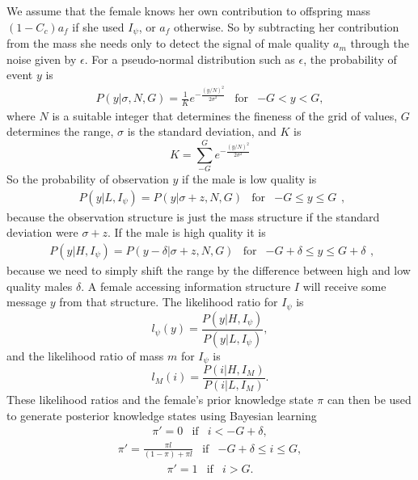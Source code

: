 \documentclass[10pt]{article}
\begin{document}
We assume that the female knows her own contribution to offspring mass $(1-C_c)a_f$ if she used $I_\psi$, or $a_f$ otherwise. So by subtracting her contribution from the mass she needs only to detect the signal of male quality $a_m$ through the noise given by $\epsilon$. For a pseudo-normal distribution such as $\epsilon$, the probability of event $y$ is
\begin{equation}
	\begin{array}{ccc}
		P(y|\sigma,N,G) = \frac{1}{K}e^{-\frac{(y/N)^{2}}{2\sigma^{2}}} & \text{for} & -G<y<G,\end{array}\label{eq:-2}
\end{equation}
where $N$ is a suitable integer that determines the fineness of the
grid of values, $G$ determines the range, $\sigma$ is the standard deviation, and $K$ is
\[
K=\underset{-G}{\overset{G}{\boldsymbol{\sum}}}e^{-\frac{(y/N)^{2}}{2\sigma^{2}}}
\]
So the probability of observation $y$ if the male is low quality is 
\[
\begin{array}{ccc}
	P(y|L,I_\psi)= P(y|\sigma+z,N,G) & \text{for} & -G\leq y\leq G\end{array},
\]
because the observation structure is just the mass structure if the standard deviation were $\sigma+z$. If the male is high quality it is
\[
\begin{array}{ccc}
	P(y|H,I_\psi)= P(y-\delta|\sigma+z,N,G) & \text{for} & -G+\delta\leq y\leq G+\delta\end{array},
\]
because we need to simply shift the range by the difference between high and low quality males $\delta$.
A female accessing information structure $I$ will receive some message $y$ from that structure. The likelihood ratio for $I_\psi$ is 
\begin{equation}
	l_{\psi}(y)=\frac{P(y|H,I_\psi)}{P(y|L,I_\psi)},
\end{equation}
and the likelihood ratio of mass $m$ for $I_\psi$ is 
\[  
l_{M}(i)=\frac{P(i|H,I_M)}{P(i|L,I_M)}.
\]
These likelihood ratios and the female's prior knowledge state $\pi$ can then be used to generate posterior knowledge states using Bayesian learning
\[
\begin{array}{ccc}
	\pi'=0 & \text{if} & i<-G+\delta,\end{array}
\]
\[
\begin{array}{ccc}
	\pi'=\frac{\pi l}{(1-\pi)+\pi l} & \text{if} & -G+\delta\leq i\leq G,\end{array}
\]
\[
\begin{array}{ccc}
	\pi'=1 & \text{if} & i>G.\end{array}
\]
\end{document}
